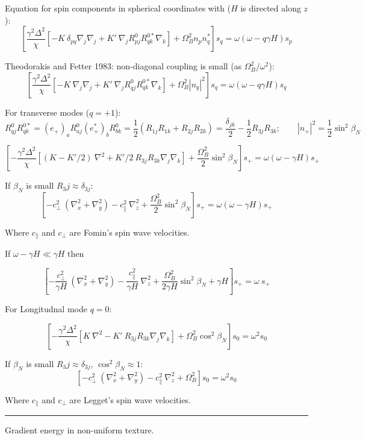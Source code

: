 \documentclass[a4paper]{article}
\begin{document}
Equation for spin components in spherical coordinates with
($H$ is directed along $z$):
$$
\left[
\frac{\gamma^2\Delta^2}{\chi}
  [-K\ \delta_{pq} \nabla_j\nabla_j
 + K'\ \nabla_j R^0_{pj}R^{0*}_{qk}\nabla_k]
+ \Omega_B^2 n_p n_q^*
\right] s_q =
\omega(\omega-q\gamma H) s_p
$$

Theodorakis and Fetter 1983: non-diagonal coupling is small
(as $\Omega_B^2/\omega^2$):
$$
\left[
\frac{\gamma^2\Delta^2}{\chi}
  [-K\ \nabla_j\nabla_j
 + K'\ \nabla_j R^0_{qj}R^{0*}_{qk}\nabla_k]
+ \Omega_B^2 |n_q|^2
\right] s_q =
\omega(\omega-q\gamma H) s_q
$$

For transverse modes ($q=+1$):
$$
R^0_{qj} R^{0*}_{qk}
= (e_{+})_a R^0_{aj} (e_{+}^*)_b R^{0}_{bk}
= \frac12 (R_{1j}R_{1k}+R_{2j}R_{2k})
= \frac{\delta_{jk}}{2}  - \frac12 R_{3j}R_{3k};
\qquad
|n_{+}|^2 = \frac12 \sin^2\beta_N
$$

$$
\left[ -
\frac{\gamma^2\Delta^2}{\chi}
  \left[(K-K'/2)\ \nabla^2
  + K'/2\ R_{3j}R_{3k} \nabla_j\nabla_k
  \right]
+ \frac{\Omega_B^2}{2} \sin^2\beta_N
\right] s_{+} =
\omega(\omega-\gamma H) s_{+}
$$

If $\beta_N$ is small $R_3j \approx \delta_{3j}$:
$$
\left[
- {c_\perp^2}\ (\nabla_x^2+\nabla_y^2)
- {c_\parallel^2}\ \nabla_z^2
+ \frac{\Omega_B^2}{2} \sin^2\beta_N
\right] s_{+} =
\omega(\omega-\gamma H) s_{+}
$$

Where $c_\parallel$ and $c_\perp$ are Fomin's spin wave velocities.

If $\omega-\gamma H \ll \gamma H$ then

$$
\left[
- \frac{c_\perp^2}{\gamma H}\ (\nabla_x^2+\nabla_y^2)
- \frac{c_\parallel^2}{\gamma H}\ \nabla_z^2
+ \frac{\Omega_B^2}{2\gamma H} \sin^2\beta_N + \gamma H
\right] s_{+} =
\omega\ s_{+}
$$

For Longitudnal mode $q=0$:

$$
\left[ -
\frac{\gamma^2\Delta^2}{\chi}
  \left[K\ \nabla^2
  - K'\ R_{3j}R_{3k} \nabla_j\nabla_k
  \right]
+ \Omega_B^2\cos^2\beta_N
\right] s_0 =
\omega^2 s_0
$$

If $\beta_N$ is small $R_3j \approx \delta_{3j}$, $\cos^2\beta_N\approx 1$:
$$
\left[
- {c_\perp^2}\ (\nabla_x^2+\nabla_y^2)
- {c_\parallel^2}\ \nabla_z^2
+ \Omega_B^2 \right] s_0 =
\omega^2 s_0
$$

Where $c_\parallel$ and $c_\perp$ are Legget's spin wave velocities.

\eject
\hrule
\medskip

Gradient energy in non-uniform texture.
\end{document}
